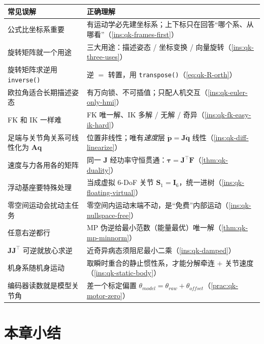 \begin{table}[H]\centering\small
\begin{tabular}{p{} p{}}
\toprule
\textbf{常见误解} & \textbf{正确理解} \\
\midrule
公式比坐标系重要 & 有运动学必先建坐标系；上下标只在回答“哪个系、从哪看”（\cref{ins:qk-frames-first}）\\
旋转矩阵就一个用途 & 三大用途：描述姿态 / 坐标变换 / 向量旋转（\cref{ins:qk-three-uses}）\\
旋转矩阵求逆用 \texttt{inverse()} & 逆 $=$ 转置，用 \texttt{transpose()}（\cref{eq:qk-R-orth}）\\
欧拉角适合长期描述姿态 & 有万向锁、不可插值；只配人机交互（\cref{ins:qk-euler-only-hmi}）\\
FK 和 IK 一样难 & FK 唯一解、IK 多解 / 无解 / 奇异（\cref{ins:qk-fk-easy-ik-hard}）\\
足端与关节角关系可线性化为 $\mathbf{A}\boldsymbol{q}$ & 位置非线性；唯有\emph{速度}层 $\dot{\boldsymbol{p}}=\mathbf{J}\dot{\boldsymbol{q}}$ 线性（\cref{ins:qk-diff-linearize}）\\
速度与力各用各的矩阵 & 同一 $\mathbf{J}$ 经功率守恒贯通：$\boldsymbol{\tau}=\mathbf{J}^\top\mathbf{F}$（\cref{thm:qk-duality}）\\
浮动基座要特殊处理 & 当成虚拟 $6$-DoF 关节 $\mathbf{S}_1=\mathbf{I}_6$，统一进树（\cref{ins:qk-floating-virtual}）\\
零空间运动会扰动主任务 & 零空间内运动末端不动，是“免费”内部运动（\cref{ins:qk-nullspace-free}）\\
任意右逆都行 & MP 伪逆给最小范数（能量最优）唯一解（\cref{thm:qk-mp-minnorm}）\\
$\mathbf{J}\mathbf{J}^\top$ 可逆就放心求逆 & 近奇异病态须阻尼最小二乘（\cref{ins:qk-damped}）\\
机身系随机身运动 & 取瞬时重合的静止惯性系，才能分解牵连 $+$ 关节速度（\cref{ins:qk-static-body}）\\
编码器读数就是模型关节角 & 差一个标定偏置 $\theta_{model}=\theta_{raw}+\theta_{offset}$（\cref{prac:qk-motor-zero}）\\
\bottomrule
\end{tabular}
\end{table}

\section*{本章小结}

